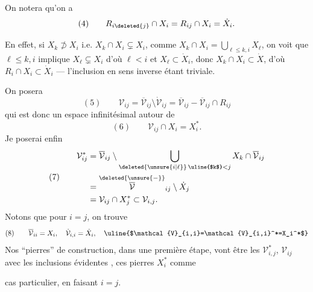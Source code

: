 
On notera qu'on a
\[
(4)\qquad R_{i\deleted{j}}\cap X_i=R_{ij}\cap X_i=\dot X_i.
\]

En effet, si $X_k\not\supset X_i$ i.e. $X_k\cap X_i\subsetneq X_i$, comme $X_k\cap X_i=\bigcup_{\ell\leq k,i}X_\ell$, on voit que  $\ell\leq k,i$ implique $X_\ell\subsetneq X_i$ d'où $\ell<i$ et $X_\ell\subset\dot X_i$, donc $X_k\cap X_i\subset\dot X$, d'où $R_i\cap X_i\subset\dot X_i$ — l'inclusion en sens inverse étant triviale.

On posera 
\[
(5)\qquad \mathcal{V}_{ij}=\overline{\mathcal{V}}_{ij}\setminus\dot{\mathcal{V}}_{ij}=\overline{\mathcal{V}}_{ij}-\overline{\mathcal{V}}_{ij}\cap R_{ij}
\]
qui est donc un espace infinitésimal autour de
\[
(6)\qquad \mathcal{V}_{ij}\cap X_i=X_i^*.
\]
Je poserai enfin
\[
(7)\qquad\begin{aligned}
\mathcal{V}_{ij}^*&=\overline{\mathcal{V}}_{ij}\setminus\bigcup_{\deleted{\unsure{i|\ell}}\,\text{\uline{$k$}}<j}X_k\cap\overline{\mathcal{V}}_{ij}\\
&=\overset{\deleted{\unsure{-}}}{\overline{\mathcal{V}}}_{ij}\setminus\dot X_j\\
&=\mathcal{V}_{ij}\cap X_j^*\subset\mathcal{V}_{i,j}.
\end{aligned}
\]
Notons que pour $i=j$, on trouve
\[
(8)\qquad\overline{\mathcal{V}}_{ii}=X_i,\quad\dot{\mathcal{V}}_{i,i}=\dot X_i,\quad\text{\uline{$\mathcal{V}_{i,i}=\mathcal{V}_{i,i}^*=X_i^*$}}
\]
Nos ``pierres'' de construction, dans une première étape, vont être les $\mathcal{V}_{i,j}^*$, $\mathcal{V}_{ij}$ avec les inclusions évidentes
,
ces pierres   $X_i^*$ comme

cas particulier, en faisant $i=j$.

